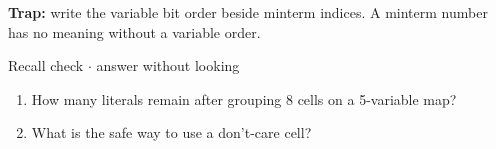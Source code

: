 \documentclass[11pt]{article}
\begin{document}
\begin{keepsection}
\begin{notebox}\textbf{Trap:} write the variable bit order beside minterm indices. A minterm number has no meaning without a variable order.\end{notebox}

\begin{recallbox}{Recall check \ensuremath{\cdot} answer without looking}
\begin{enumerate}
\item How many literals remain after grouping 8 cells on a 5-variable map?
\item What is the safe way to use a don’t-care cell?
\end{enumerate}

\end{recallbox}
\end{keepsection}
\end{document}
